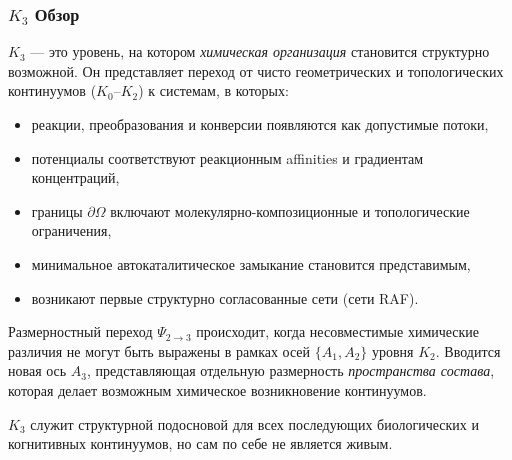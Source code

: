 

\subsubsection{\texorpdfstring{$K_3$}{K_3} Обзор}
\label{sec:k3-overview}

$K_3$ — это уровень, на котором
\emph{химическая организация} становится
структурно возможной. Он представляет переход от чисто геометрических
и топологических континуумов ($K_0$--$K_2$) к системам, в которых:
\begin{itemize}
    \item реакции, преобразования и конверсии появляются как допустимые
          потоки,
    \item потенциалы соответствуют реакционным affinities и градиентам
          концентраций,
    \item границы $\partial\Omega$ включают молекулярно-композиционные и
          топологические ограничения,
    \item минимальное автокаталитическое замыкание становится представимым,
    \item возникают первые структурно согласованные сети (сети RAF).
\end{itemize}

Размерностный переход $\Psi_{2\to3}$ происходит, когда несовместимые
химические различия не могут быть выражены в рамках осей $\{A_1,A_2\}$
уровня $K_2$. Вводится новая ось $A_3$, представляющая отдельную
размерность
\emph{пространства состава}, которая делает возможным химическое
возникновение континуумов.

$K_3$ служит структурной подосновой для всех последующих биологических и
когнитивных континуумов, но сам по себе не является живым.

